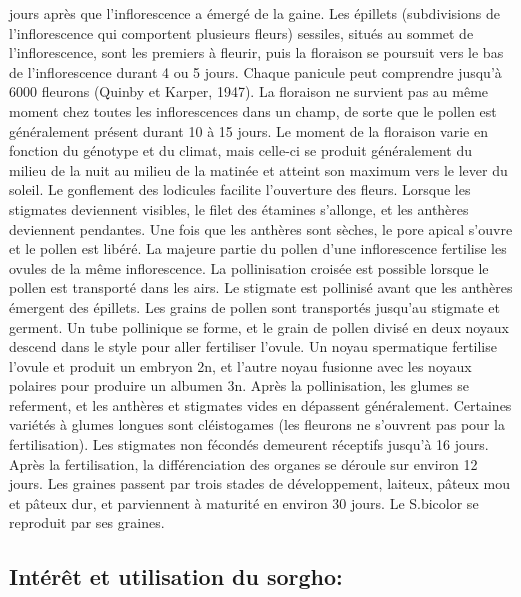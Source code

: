 \documentclass[a4paper,11pt]{article}
\begin{document}
jours après que l’inflorescence a émergé de la gaine. Les
épillets (subdivisions de l’inflorescence qui comportent
plusieurs fleurs) sessiles, situés au sommet de l’inflorescence,
sont les premiers à fleurir, puis la floraison se poursuit vers
le bas de l’inflorescence durant 4 ou 5 jours. Chaque panicule
peut comprendre jusqu’à 6000 fleurons (Quinby et Karper,
1947). La floraison ne survient pas au même moment chez toutes
les inflorescences dans un champ, de sorte que le pollen est
généralement présent durant 10 à 15 jours. Le moment de la
floraison varie en fonction du génotype et du climat, mais
celle-ci se produit généralement du milieu de la nuit au milieu
de la matinée et atteint son maximum vers le lever du soleil. Le
gonflement des lodicules facilite l’ouverture des fleurs. Lorsque
les stigmates deviennent visibles, le filet des étamines
s’allonge, et les anthères deviennent pendantes. Une fois que les
anthères sont sèches, le pore apical s’ouvre et le pollen est
libéré. La majeure partie du pollen d’une inflorescence fertilise
les ovules de la même inflorescence. La pollinisation croisée est
possible lorsque le pollen est transporté dans les airs. Le
stigmate est pollinisé avant que les anthères émergent des
épillets. Les grains de pollen sont transportés jusqu’au stigmate
et germent. Un tube pollinique se forme, et le grain de pollen
divisé en deux noyaux descend dans le style pour aller fertiliser
l’ovule. Un noyau spermatique fertilise l’ovule et produit un
embryon 2n, et l’autre noyau fusionne avec les noyaux polaires
pour produire un albumen 3n. Après la pollinisation, les glumes
se referment, et les anthères et stigmates vides en dépassent
généralement. Certaines variétés à glumes longues sont
cléistogames (les fleurons ne s’ouvrent pas pour la
fertilisation). Les stigmates non fécondés demeurent réceptifs
jusqu’à 16 jours. Après la fertilisation, la différenciation des
organes se déroule sur environ 12 jours. Les graines passent par
trois stades de développement, laiteux, pâteux mou et pâteux dur,
et parviennent à maturité en environ 30 jours. Le S.bicolor se
reproduit par ses graines.
  
\subsection{Intérêt et utilisation du sorgho:}
\end{document}
